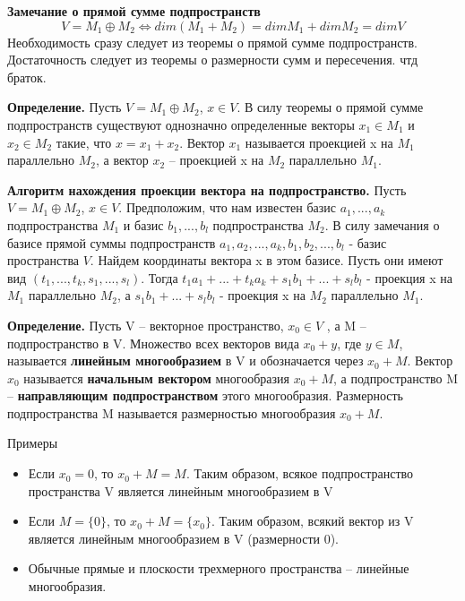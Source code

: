 \documentclass[a4paper]{article}
\begin{document}
    \begin{htheorem}
        \textbf{Замечание о прямой сумме подпространств} \begin{equation}
                                                             V = M_1 \oplus M_2 \Leftrightarrow dim(M_1 + M_2) = dim M_1 + dim M_2 = dim V
        \end{equation}
        Необходимость сразу следует из теоремы о прямой сумме подпространств.
        Достаточность следует из теоремы о размерности сумм и пересечения. чтд браток.
    \end{htheorem}

    \textbf{Определение.}  Пусть $V = M_1 \oplus M_2$, $x \in V$. В силу теоремы о прямой сумме подпространств существуют однозначно определенные векторы $x_1 \in M_1$ и
    $x_2 \in M_2$ такие, что $x = x_1 + x_2$. Вектор $x_1$ называется проекцией x на $M_1$
    параллельно $M_2$, а вектор $x_2$ – проекцией x на $M_2$ параллельно $M_1$.



    \textbf{Алгоритм нахождения проекции вектора на подпространство.} Пусть $V = M_1 \oplus M_2$, $x \in V$. Предположим, что нам известен базис $a_1, ..., a_k$ подпространства $M_1$ и базис $b_1, ..., b_l$ подпространства $M_2$. В силу замечания о базисе прямой суммы подпространств $a_1, a_2, ..., a_k, b_1, b_2, ... ,b_l$ - базис пространства $V$. Найдем координаты вектора x в этом базисе. Пусть они имеют вид $(t_1, ..., t_k, s_1, ..., s_l)$. Тогда $t_1a_1 + ... + t_ka_k + s_1b_1 + ... + s_lb_l$ - проекция x на $M_1$ параллельно $M_2$, а $s_1b_1 + ... + s_lb_l$ - проекция x на $M_2$ параллельно $M_1$.


    \textbf{Определение.} Пусть V – векторное пространство, $x_0 \in V$ , а M – подпространство в V.
    Множество всех векторов вида $x_0 + y$, где $y \in M$, называется \textbf{линейным
    многообразием} в V и обозначается через $x_0 + M$. Вектор $x_0$ называется
    \textbf{начальным вектором }многообразия $x_0 + M$, а подпространство M –
    \textbf{направляющим подпространством} этого многообразия. Размерность
    подпространства M называется размерностью многообразия $x_0 + M$.

    Примеры
    \begin{itemize}
        \item Если $x_0 = 0$, то $x_0 + M = M$. Таким образом, всякое
        подпространство пространства V является линейным многообразием в V
        \item Если $M = \{ 0 \}$, то $x_0 + M = \{ x_0 \}$. Таким образом, всякий
        вектор из V является линейным многообразием в V (размерности 0).
        \item Обычные прямые и плоскости трехмерного пространства –
        линейные многообразия.
    \end{itemize}
\end{document}
